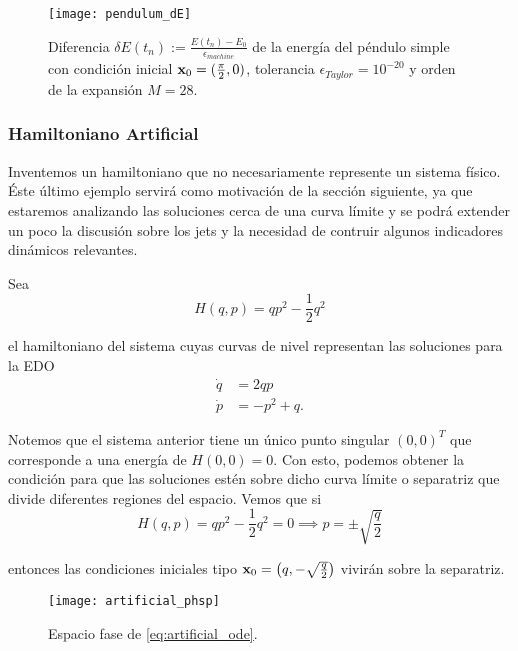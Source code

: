 \begin{figure}[h!]
 \centering
 \texttt{[image: pendulum\_dE]}
 \caption{Diferencia $\delta E(t_n) := \frac{E(t_n) - E_0}{\epsilon_{machine}}$ de la energía del péndulo simple con condición inicial $\mathbf{x}_0 = (\frac{\pi}{2},0)$, tolerancia $\epsilon_{Taylor} = 10^{-20}$ y orden de la expansión $M = 28$.}
 \label{fig:pendulum_dE}
\end{figure}

\clearpage
\subsubsection{Hamiltoniano Artificial}
\label{sec:artificial_ham}

Inventemos un hamiltoniano que no necesariamente represente un sistema físico. Éste último ejemplo servirá como motivación de la sección siguiente, ya que estaremos analizando las soluciones cerca de una curva límite y se podrá extender un poco la discusión sobre los jets y la necesidad de contruir algunos indicadores dinámicos relevantes. 

Sea 
\begin{equation}
 H(q,p) = qp^2 - \frac{1}{2}q^2
 \label{eq:artificial_ham}
\end{equation}

el hamiltoniano del sistema cuyas curvas de nivel representan las soluciones para la EDO
\begin{align}
 \dot{q} &= 2qp \nonumber \\
 \dot{p} &= -p^2 + q.
 \label{eq:artificial_ode}
\end{align}


Notemos que el sistema anterior tiene un único punto singular $(0,0)^T$ que corresponde a una energía de $H(0,0) = 0$. Con esto, podemos obtener la condición para que las soluciones estén sobre dicho curva límite o separatriz que divide diferentes regiones del espacio. Vemos que si
\begin{equation*}
 H(q,p) = qp^2 - \frac{1}{2}q^2 = 0 \implies p = \pm \sqrt{\frac{q}{2}} 
\end{equation*}

entonces las condiciones iniciales tipo $\mathbf{x}_0 = \left( q, -\sqrt{\frac{q}{2}} \right)$ vivirán sobre la separatriz. 

\begin{figure}[h!]
 \centering
 \texttt{[image: artificial\_phsp]}
 \caption{Espacio fase de \ref{eq:artificial_ode}.}
 \label{fig:artificial_phsp}
\end{figure}

